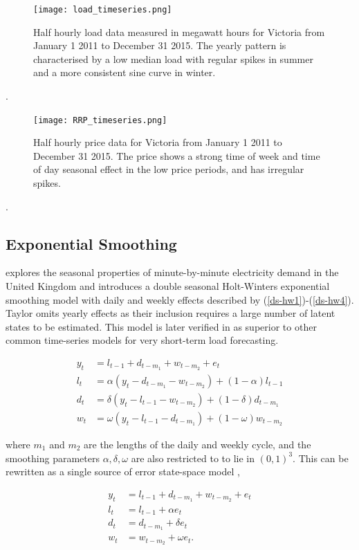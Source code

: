 \documentclass[12pt,a4paper]{article}%
\numberwithin{equation}{section}
\begin{document}
\begin{figure}[h]
\centering
\texttt{[image: load\_timeseries.png]}
\caption{Half hourly load data measured in megawatt hours for Victoria from January 1 2011 to December 31 2015. The yearly pattern is characterised by a low median load with regular spikes in summer and a more consistent sine curve in winter.}
\label{loadplot}
\end{figure}.

\begin{figure}[h]
\centering
\texttt{[image: RRP\_timeseries.png]}
\caption{Half hourly price data for Victoria from January 1 2011 to December 31 2015. The price shows a strong time of week and time of day seasonal effect in the low price periods, and has irregular spikes.}
\label{rrpplot}
\end{figure}.

\subsection{Exponential Smoothing}

\citet{Taylor2003} explores the seasonal properties of minute-by-minute electricity demand in the United Kingdom and introduces a double seasonal Holt-Winters exponential smoothing model with daily and weekly effects described by (\ref{ds-hw1})-(\ref{ds-hw4}). Taylor omits yearly effects as their inclusion requires a large number of latent states to be estimated. This model is later verified in \citet{Taylor2008} as superior to other common time-series models for very short-term load forecasting.

\begin{align}
y_t &= l_{t-1} + d_{t-m_1} + w_{t-m_2} + e_t \label{ds-hw1} \\
l_t &= \alpha (y_t - d_{t-m_1} - w_{t-m_2}) + (1 - \alpha)l_{t-1} \label{ds-hw2}\\
d_t &= \delta (y_t - l_{t-1} - w_{t-m_2}) + (1 - \delta)d_{t-m_1} \label{ds-hw3} \\
w_t &= \omega (y_t - l_{t-1} - d_{t-m_1}) + (1 - \omega)w_{t-m_2} \label{ds-hw4}
\end{align}

where $m_1$ and $m_2$ are the lengths of the daily and weekly cycle, and the smoothing parameters $\alpha, \delta, \omega$ are also restricted to to lie in $(0, 1)^3$. This can be rewritten as a single source of error state-space model \citep{Snyder1985},

\begin{align}
y_t &= l_{t-1} + d_{t-m_1} + w_{t-m_2} + e_t \label{ds-hw-ssoe1} \\
l_t &= l_{t-1} + \alpha e_t \label{ds-hw-ssoe2} \\
d_t &= d_{t-m_1} + \delta e_t \label{ds-hw-ssoe3} \\
w_t &= w_{t-m_2} + \omega e_t \label{ds-hw-ssoe4}. 
\end{align}
\end{document}
